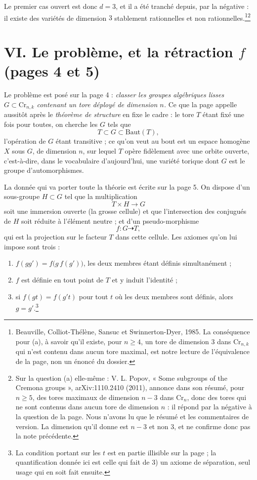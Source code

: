 \documentclass[11pt,a4paper]{article}
\begin{document}
Le premier cas ouvert est donc $d = 3$, et il a été tranché depuis, par la
négative : il existe des variétés de dimension $3$ stablement rationnelles et
non rationnelles.\footnote{Beauville, Colliot-Thélène, Sansuc et
Swinnerton-Dyer, 1985. La conséquence pour (a), à savoir qu'il existe, pour $n \geq 4$,
un tore de dimension $3$ dans $\mathrm{Cr}_{n,k}$ qui n'est contenu dans aucun
tore maximal, est notre lecture de l'équivalence de la page, non un énoncé du
dossier.}\footnote{Sur la question (a) elle-même : V. L. Popov, « Some
subgroups of the Cremona groups », arXiv:1110.2410 (2011), annonce dans son
résumé, pour $n \geq 5$, des tores maximaux de dimension $n - 3$ dans
$\mathrm{Cr}_n$, donc des tores qui ne sont contenus dans aucun tore de
dimension $n$ : il répond par la négative à la question de la page. Nous
n'avons lu que le résumé et les commentaires de version. La dimension qu'il
donne est $n - 3$ et non $3$, et ne confirme donc pas la note précédente.}

\section*{VI. Le problème, et la rétraction $f$ (pages 4 et 5)}

Le problème est posé sur la page 4 : \emph{classer les groupes algébriques
lisses $G \subset \mathrm{Cr}_{n,k}$ contenant un tore déployé de dimension
$n$.} Ce que la page appelle aussitôt après le \emph{théorème de structure}
en fixe le cadre : le tore $T$ étant fixé une fois pour toutes, on cherche les
$G$ tels que
\[
  T \subset G \subset \mathrm{Baut}(T),
\]
l'opération de $G$ étant transitive ; ce qu'on veut au bout est un espace
homogène $X$ sous $G$, de dimension $n$, sur lequel $T$ opère fidèlement avec
une orbite ouverte, c'est-à-dire, dans le vocabulaire d'aujourd'hui, une
variété torique dont $G$ est le groupe d'automorphismes.

La donnée qui va porter toute la théorie est écrite sur la page 5. On dispose
d'un sous-groupe $H \subset G$ tel que la multiplication
\[
  T \times H \longrightarrow G
\]
soit une immersion ouverte (la grosse cellule) et que l'intersection des
conjugués de $H$ soit réduite à l'élément neutre ; et d'un pseudo-morphisme
\[
  f : G \dashrightarrow T,
\]
qui est la projection sur le facteur $T$ dans cette cellule. Les axiomes qu'on
lui impose sont trois :

\begin{enumerate}
  \item[1)] $f(gg') = f\bigl(g\,f(g')\bigr)$, les deux membres étant définis
    simultanément ;
  \item[2)] $f$ est définie en tout point de $T$ et y induit l'identité ;
  \item[3)] si $f(gt) = f(g't)$ pour tout $t$ où les deux membres sont
    définis, alors $g = g'$.\footnote{La condition portant sur les $t$ est en
    partie illisible sur la page ; la quantification donnée ici est celle qui
    fait de 3) un axiome de séparation, seul usage qui en soit fait ensuite.}
\end{enumerate}
\end{document}
